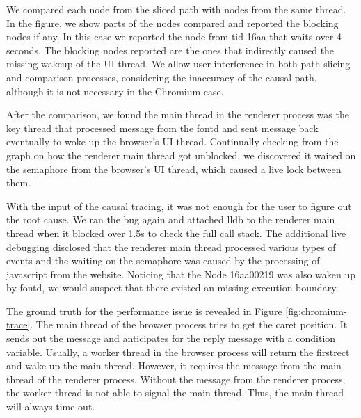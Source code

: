We compared each node from the sliced path with nodes from the same thread.
In the figure, we show parts of the nodes compared and reported the blocking nodes if any.
In this case we reported the node from tid 16aa that waits over 4 seconds.
The blocking nodes reported are the ones that indirectly caused the missing wakeup of the UI thread.
We allow user interference in both path slicing and comparison processes, considering the inaccuracy of the causal path, although it is not necessary in the Chromium case.

After the comparison, we found the main thread in the renderer process was the key thread that processed message from the fontd and sent message back eventually to woke up the browser's UI thread.
Continually checking from the graph on how the renderer main thread got unblocked, we discovered it waited on the semaphore from the browser's UI thread, which caused a live lock between them.

With the input of the causal tracing, it was not enough for the user to figure out the root cause.
We ran the bug again and attached lldb to the renderer main thread when it blocked over 1.5s to check the full call stack.
The additional live debugging disclosed that the renderer main thread processed various types of events and the waiting on the semaphore was caused by the processing of javascript from the website.   
Noticing that the Node 16aa00219 was also waken up by fontd, we would suspect that there existed an missing execution boundary.

The ground truth for the performance issue is revealed in Figure \ref{fig:chromium-trace}.
The main thread of the browser process tries to get the caret position.
It sends out the message and anticipates for the reply message with a condition variable.
Usually, a worker thread in the browser process will return the firstrect and wake up the main thread.
However, it requires the message from the main thread of the renderer process.
Without the message from the renderer process, the worker thread is not able to signal the main thread.
Thus, the main thread will always time out.
